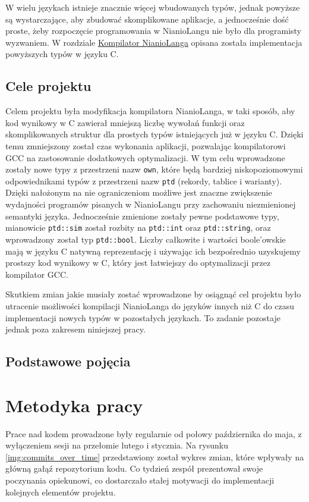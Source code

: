 \documentclass[licencjacka]{pracamgr}
\begin{document}
W wielu językach istnieje znacznie więcej wbudowanych typów, jednak powyższe są wystarczające, aby zbudować skomplikowane aplikacje,
a jednocześnie dość proste, żeby rozpoczęcie programowania w NianioLangu nie było dla programisty wyzwaniem.
W rozdziale \hyperref[sec:compiler]{Kompilator NianioLanga} opisana została implementacja powyższych typów w języku C.

\section{Cele projektu}
Celem projektu była modyfikacja kompilatora NianioLanga, w taki sposób, aby kod wynikowy w C zawierał mniejszą liczbę wywołań funkcji oraz skomplikowanych
struktur dla prostych typów istniejących już w języku C.
Dzięki temu zmniejszony został czas wykonania aplikacji, pozwalając kompilatorowi GCC na zastosowanie dodatkowych optymalizacji.
W tym celu wprowadzone zostały nowe typy z przestrzeni nazw \texttt{own},
które będą bardziej niskopoziomowymi odpowiednikami typów z przestrzeni nazw \texttt{ptd} (rekordy, tablice i warianty).
Dzięki nałożonym na nie ograniczeniom możliwe jest znaczne zwiększenie wydajności programów pisanych w NianioLangu przy zachowaniu
niezmienionej semantyki języka.
Jednocześnie zmienione zostały pewne podstawowe typy, mianowicie \texttt{ptd::sim} został rozbity na
\texttt{ptd::int} oraz \texttt{ptd::string}, oraz wprowadzony został typ \texttt{ptd::bool}.
Liczby całkowite i wartości boole'owskie mają w języku C natywną reprezentację i używając ich bezpośrednio
uzyskujemy prostszy kod wynikowy w C, który jest łatwiejszy do optymalizacji przez kompilator GCC.

Skutkiem zmian jakie musiały zostać wprowadzone by osiągnąć cel projektu było utracenie możliwości
kompilacji NianioLanga do języków innych niż C do czasu implementacji nowych typów w pozostałych językach.
To zadanie pozostaje jednak poza zakresem niniejszej pracy.

\section{Podstawowe pojęcia}

\chapter{Metodyka pracy}
Prace nad kodem prowadzone były regularnie od połowy października do maja,
z wyłączeniem sesji na przełomie lutego i stycznia. Na rysunku \ref{img:commits_over_time}
przedstawiony został wykres zmian, które wpływały na główną gałąź repozytorium kodu.
Co tydzień zespół prezentował swoje poczynania opiekunowi, co dostarczało stałej motywacji
do implementacji kolejnych elementów projektu.
\end{document}
